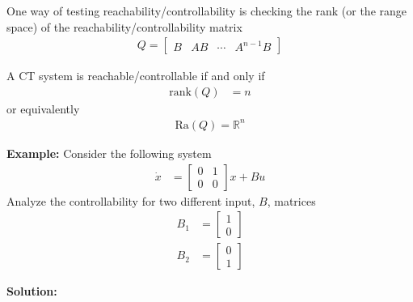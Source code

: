 \documentclass[twoside]{article}
\begin{document}
One way of testing reachability/controllability is checking the rank
(or the range space) of the reachability/controllability matrix
%
\begin{align*}
  Q = \left[ \begin{array}{cccc} B & A B & \cdots & A^{n-1} B \end{array} \right]
\end{align*} 
%

A CT system is reachable/controllable if and only if
%
\begin{align*}
  \mathrm{rank} ( Q ) &= n
\end{align*} 
%
or equivalently 
%
\begin{align*}
 \mathrm{Ra} ( Q ) = \mathbb{R}^n
\end{align*} 


\textbf{Example:} Consider the following system
%
\begin{align*}
  \dot{x} &= \left[ \begin{array}{cc} 0 & 1 \\ 0 & 0 \end{array}
                                                   \right] x + B u 
\end{align*}
%
Analyze the controllability for two different input, $B$,
matrices
%
\begin{align*}
 B_1 &= \left[ \begin{array}{c} 1 \\ 0 \end{array} \right] 
  \\
 B_2 &= \left[ \begin{array}{c} 0 \\ 1 \end{array} \right] 
\end{align*}
%

\textbf{Solution:}
\end{document}
